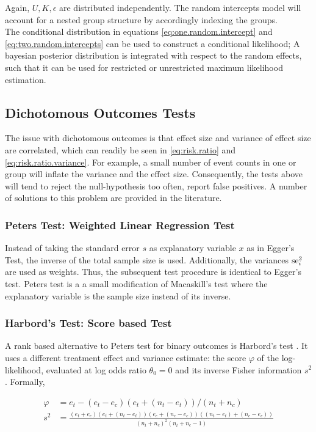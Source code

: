 \documentclass[11pt,a4paper,twoside]{book}\usepackage[]{graphicx}\usepackage[]{color}
\begin{document}
Again, $U, K, \epsilon$ are distributed independently. The random intercepts model will account for a nested group structure by accordingly indexing the groups. \\
The conditional distribution in equations \eqref{eq:one.random.intercept} and \eqref{eq:two.random.intercepts} can be used to construct a conditional likelihood; A bayesian posterior distribution is integrated with respect to the random effects, such that it can be used for restricted or unrestricted maximum likelihood estimation.


\subsection{Dichotomous Outcomes Tests}
 
The issue with dichotomous outcomes is that effect size and variance of effect size are correlated, which can readily be seen in \eqref{eq:risk.ratio} and \eqref{eq:risk.ratio.variance}. For example, a small number of event counts in one or group will inflate the variance and the effect size. Consequently, the tests above will tend to reject the null-hypothesis too often, \ie report false positives. A number of solutions to this problem are provided in the literature.


\subsubsection{Peters Test: Weighted Linear Regression Test} \label{sec:Peter}
Instead of taking the standard error $s$ as explanatory variable $x$ as in Egger's Test, the inverse of the total sample size is used. Additionally, the variances $\operatorname{se}_i^2$ are used as weights. Thus, the subsequent test procedure is identical to Egger's test. Peters test is a a small modification of Macaskill's test where the explanatory variable is the sample size instead of its inverse.


\subsubsection{Harbord's Test: Score based Test} \label{sec:Harbord}
A rank based alternative to Peters test for binary outcomes is Harbord's test \citep{Harbord}.
It uses a different treatment effect and variance estimate: the score $\varphi$ of the log-likelihood, evaluated at log odds ratio $\theta_0 = 0$ and its inverse Fisher information $s^2$. Formally,

\begin{align}
\varphi &= e_t - (e_t - e_c)(e_t + (n_t - e_t))/(n_t + n_c) \label{harbord.score} \\
 s^2 &= \frac{(e_t + e_c)(e_t + (n_t - e_t))(e_c + (n_c - e_c))((n_t - e_t) + (n_c - e_c))}{(n_t + n_c)^2(n_t + n_c - 1)} \label{harbord.variance}
\end{align}
\end{document}
